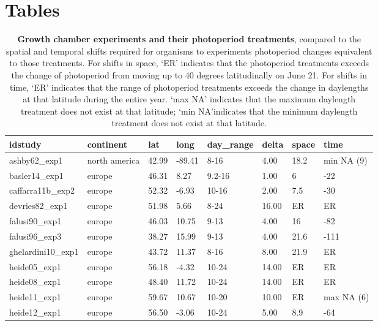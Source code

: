 \documentclass{article}
\begin{document}
\section* {Tables}
\begin{table}[ht]
\centering
\caption{\textbf{Growth chamber experiments and their photoperiod treatments}, compared to the spatial and temporal shifts required for organisms to experiments photoperiod changes equivalent to those treatments. For shifts in space, `ER' indicates that the photoperiod treatments exceeds the change of photoperiod from moving up to 40 degrees latitudinally on June 21. For shifts in time, `ER' indicates that the range of photoperiod treatments exceeds the change in daylengths at that latitude during the entire year. `max NA' indicates that the maximum daylength treatment does not exist at that latitude; `min NA'indicates that the minimum daylength treatment does not exist at that latitude.} 
\label{table:phototreats}
\begin{tabular}{|p{}|p{}|p{}|p{}|p{}|p{}|p{}|p{}|}
  \hline
idstudy & continent & lat & long & day\_range & delta & space & time \\ 
  \hline
ashby62\_exp1 & north america & 42.99 & -89.41 & 8-16 & 4.00 & 18.2 & min NA (9) \\ 
  basler14\_exp1 & europe & 46.31 & 8.27 & 9.2-16 & 1.00 & 6 & -22 \\ 
  caffarra11b\_exp2 & europe & 52.32 & -6.93 & 10-16 & 2.00 & 7.5 & -30 \\ 
  devries82\_exp1 & europe & 51.98 & 5.66 & 8-24 & 16.00 & ER & ER \\ 
  falusi90\_exp1 & europe & 46.03 & 10.75 & 9-13 & 4.00 & 16 & -82 \\ 
  falusi96\_exp3 & europe & 38.27 & 15.99 & 9-13 & 4.00 & 21.6 & -111 \\ 
  ghelardini10\_exp1 & europe & 43.72 & 11.37 & 8-16 & 8.00 & 21.9 & ER \\ 
  heide05\_exp1 & europe & 56.18 & -4.32 & 10-24 & 14.00 & ER & ER \\ 
  heide08\_exp1 & europe & 48.40 & 11.72 & 10-24 & 14.00 & ER & ER \\ 
  heide11\_exp1 & europe & 59.67 & 10.67 & 10-20 & 10.00 & ER & max NA (6) \\ 
  heide12\_exp1 & europe & 56.50 & -3.06 & 10-24 & 5.00 & 8.9 & -64 \\ 

\end{tabular}
\end{table}
\end{document}

